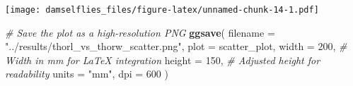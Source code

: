 \documentclass[
]{article}
\newenvironment{Shaded}{\begin{snugshade}}{\end{snugshade}}
\newcommand{\AttributeTok}[1]{\textcolor[rgb]{0.13,0.29,0.53}{#1}}
\newcommand{\CommentTok}[1]{\textcolor[rgb]{0.56,0.35,0.01}{\textit{#1}}}
\newcommand{\DecValTok}[1]{\textcolor[rgb]{0.00,0.00,0.81}{#1}}
\newcommand{\FunctionTok}[1]{\textcolor[rgb]{0.13,0.29,0.53}{\textbf{#1}}}
\newcommand{\NormalTok}[1]{#1}
\newcommand{\StringTok}[1]{\textcolor[rgb]{0.31,0.60,0.02}{#1}}
\begin{document}
\texttt{[image: damselflies\_files/figure-latex/unnamed-chunk-14-1.pdf]}

\begin{Shaded}
\begin{Highlighting}[]
\CommentTok{\# Save the plot as a high{-}resolution PNG}
\FunctionTok{ggsave}\NormalTok{(}
  \AttributeTok{filename =} \StringTok{"../results/thorl\_vs\_thorw\_scatter.png"}\NormalTok{, }
  \AttributeTok{plot =}\NormalTok{ scatter\_plot, }
  \AttributeTok{width =} \DecValTok{200}\NormalTok{,  }\CommentTok{\# Width in mm for LaTeX integration}
  \AttributeTok{height =} \DecValTok{150}\NormalTok{, }\CommentTok{\# Adjusted height for readability}
  \AttributeTok{units =} \StringTok{"mm"}\NormalTok{,}
  \AttributeTok{dpi =} \DecValTok{600}
\NormalTok{)}
\end{Highlighting}
\end{Shaded}
\end{document}
